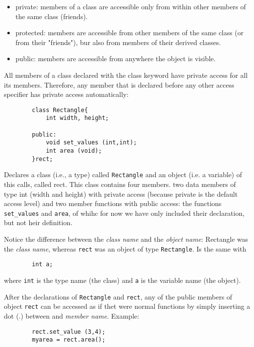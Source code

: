 		\begin{itemize}
		\item private: members of a class are accessible only from within other members of the same class (friends).
		\item protected: members are accessible from other members of the same class (or from their "friends"), bur also from members of their derived classes. 
		\item public: members are accessible from anywhere the object is visible. 
		\end{itemize}

		All members of a class declared with the class keyword have private access for all its members. Therefore, any member that is declared before any other access specifier has private access automatically: 

		\begin{verbatim}
		class Rectangle{
		    int width, height; 

		public: 
		    void set_values (int,int); 
		    int area (void); 
		}rect; 

		\end{verbatim}

		Declares a class (i.e., a type) called \verb|Rectangle| and an object (i.e. a variable) of this calls, called rect. This class contains four members. two data members of type int (width and height) with private access (because private is the default access level) and two member functions with public access: the functions \verb|set_values| and \verb|area|, of whihc for now we have only included their declaration, but not heir definition. 


		Notice the difference between the \textit{class name} and the  \textit{object name}: Rectangle was the \textit{class name}, whereas \verb|rect| was an object of type \verb|Rectangle|. Is the same with 

		\begin{verbatim}
		int a; 
		\end{verbatim}

		where \verb|int| is the type name (the class) and \verb|a| is the variable name (the object).

		After the declarations of \verb|Rectangle| and \verb|rect|, any of the public members of object \verb|rect| can be accessed as if thet were normal functions by simply inserting a dot (.) between  and \textit{member name}. Example: 

		\begin{verbatim}
		rect.set_value (3,4); 
		myarea = rect.area();
		\end{verbatim}

